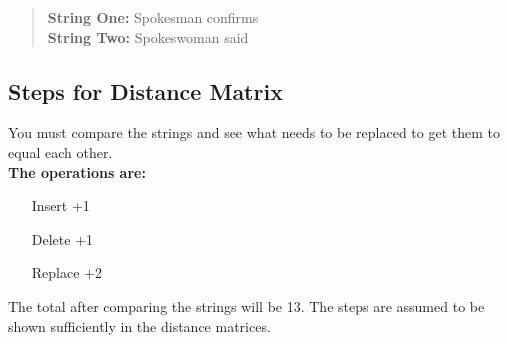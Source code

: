 
\begin{quote}
\textbf{String One: } Spokesman confirms \\
\textbf{String Two: } Spokeswoman said
\end{quote}

\subsection{Steps for Distance Matrix}
You must compare the strings and see what needs to be replaced to get them to equal each other. \\
\textbf{The operations are: }
\begin{itemize}
  \item [Insert] +1
  \item [Delete] +1
  \item [Replace] +2
\end{itemize}
The total after comparing the strings will be 13. The steps are assumed to be shown sufficiently in the distance matrices.
